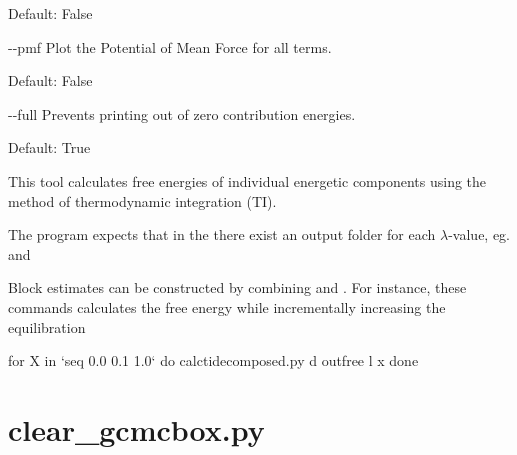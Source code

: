 \documentclass[letterpaper,10pt,english]{sphinxmanual}
\begin{document}
\begin{optionlist}{3cm}
Default: False
\item [-{-}pmf]  
Plot the Potential of Mean Force for all terms.

Default: False
\item [-{-}full]  
Prevents printing out of zero contribution energies.

Default: True
\end{optionlist}


%
\begin{sphinxVerbatim}[commandchars=\\\{\}]
  
      
     
    
\end{sphinxVerbatim}


This tool calculates free energies of individual energetic components using the method of thermodynamic integration (TI).

The program expects that in the  there exist an output folder for each \(\lambda\)-value, eg.  and 

Block estimates can be constructed by combining  and . For instance, these commands calculates the free energy while incrementally increasing the equilibration

%
\begin{sphinxVerbatim}[commandchars=\\\{\}]
for X in {}`seq 0.0 0.1 1.0{}`
do
calc\PYGZus{}ti\PYGZus{}decomposed.py \PYGZhy{}d out\PYGZus{}free \PYGZhy{}l \PYGZdl{}x
done
\end{sphinxVerbatim}


\section{clear\_gcmcbox.py}
\label{\detokenize{tools:clear-gcmcbox-py}}
\end{document}
